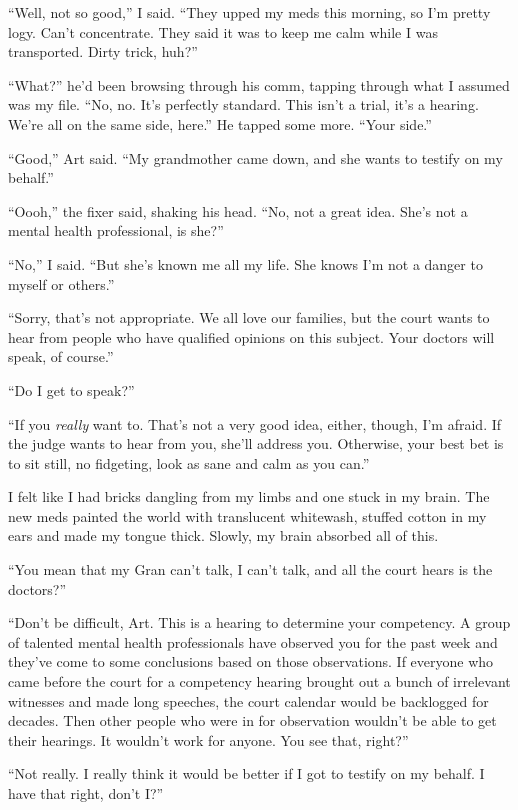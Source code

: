 “Well, not so good,” I said. “They upped my meds this morning, so
I’m pretty logy. Can’t concentrate. They said it was to keep me
calm while I was transported. Dirty trick, huh?”

“What?” he’d been browsing through his comm, tapping through what I
assumed was my file. “No, no. It’s perfectly standard. This isn’t a
trial, it’s a hearing. We’re all on the same side, here.” He tapped
some more. “Your side.”

“Good,” Art said. “My grandmother came down, and she wants to
testify on my behalf.”

“Oooh,” the fixer said, shaking his head. “No, not a great idea.
She’s not a mental health professional, is she?”

“No,” I said. “But she’s known me all my life. She knows I’m not a
danger to myself or others.”

“Sorry, that’s not appropriate. We all love our families, but the
court wants to hear from people who have qualified opinions on this
subject. Your doctors will speak, of course.”

“Do I get to speak?”

“If you \emph{really} want to. That’s not a very good idea, either,
though, I’m afraid. If the judge wants to hear from you, she’ll
address you. Otherwise, your best bet is to sit still, no
fidgeting, look as sane and calm as you can.”

I felt like I had bricks dangling from my limbs and one stuck in my
brain. The new meds painted the world with translucent whitewash,
stuffed cotton in my ears and made my tongue thick. Slowly, my
brain absorbed all of this.

“You mean that my Gran can’t talk, I can’t talk, and all the court
hears is the doctors?”

“Don’t be difficult, Art. This is a hearing to determine your
competency. A group of talented mental health professionals have
observed you for the past week and they’ve come to some conclusions
based on those observations. If everyone who came before the court
for a competency hearing brought out a bunch of irrelevant
witnesses and made long speeches, the court calendar would be
backlogged for decades. Then other people who were in for
observation wouldn’t be able to get their hearings. It wouldn’t
work for anyone. You see that, right?”

“Not really. I really think it would be better if I got to testify
on my behalf. I have that right, don’t I?”

